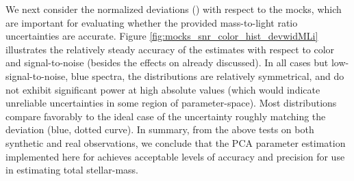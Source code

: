 We next consider the normalized deviations () with respect to the mocks, which are important for evaluating whether the provided mass-to-light ratio uncertainties are accurate. Figure \ref{fig:mocks_snr_color_hist_devwidMLi} illustrates the relatively steady accuracy of the  estimates with respect to color and signal-to-noise (besides the effects on  already discussed). In all cases but low-signal-to-noise, blue spectra, the  distributions are relatively symmetrical, and do not exhibit significant power at high absolute values (which would indicate unreliable uncertainties in some region of parameter-space). Most distributions compare favorably to the ideal case of the uncertainty roughly matching the deviation (blue, dotted curve). In summary, from the above tests on both synthetic and real observations, we conclude that the PCA parameter estimation implemented here for  achieves acceptable levels of accuracy and precision for use in estimating total stellar-mass.

